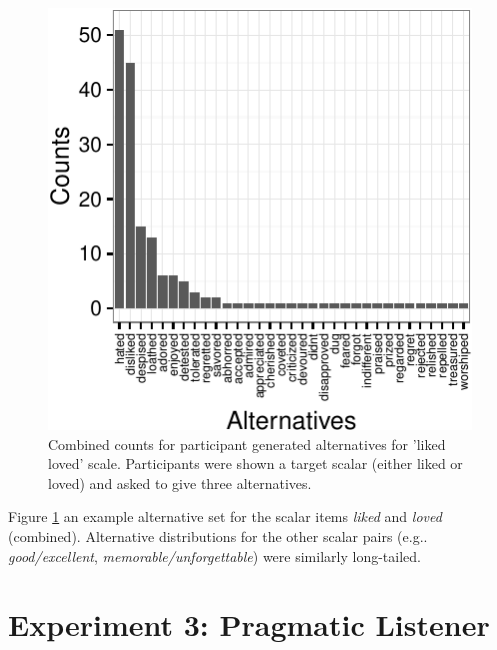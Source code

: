 \documentclass[10pt, letterpaper]{article}
\newenvironment{CodeChunk}{}{}
\begin{document}
\begin{CodeChunk}
\begin{figure}[t]

{\centering \includegraphics{figs/exp2_altsPlot_likedLoved-1} 

}

\caption[Combined counts for participant generated alternatives for 'liked  loved' scale]{Combined counts for participant generated alternatives for 'liked  loved' scale. Participants were shown a target scalar (either liked or loved) and asked to give three alternatives.}\label{fig:exp2_altsPlot_likedLoved}
\end{figure}
\end{CodeChunk}

Figure \ref{fig:exp2_altsPlot_likedLoved} an example alternative set for
the scalar items \emph{liked} and \emph{loved} (combined). Alternative
distributions for the other scalar pairs (e.g.. \emph{good/excellent},
\emph{memorable/unforgettable}) were similarly long-tailed.

\section{Experiment 3: Pragmatic
Listener}\label{experiment-3-pragmatic-listener}
\end{document}
